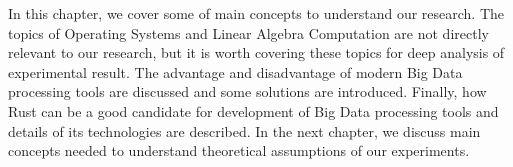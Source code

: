In this chapter, we cover some of main concepts to understand our research. 
The topics of Operating Systems and Linear Algebra Computation are not directly relevant to our research, 
but it is worth covering these topics for deep analysis of experimental result. 
The advantage and disadvantage of modern Big Data processing tools are discussed and 
some solutions are introduced. Finally, how Rust can be a good candidate for development of Big Data processing tools and 
details of its technologies are described. In the next chapter, we discuss main concepts needed to understand theoretical assumptions of our experiments.
